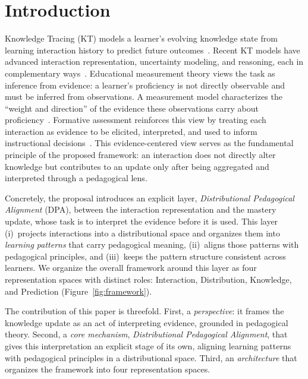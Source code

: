 \documentclass[conference]{IEEEtran}
\begin{document}
\section{Introduction}
\label{sec:intro}

Knowledge Tracing (KT) models a learner's evolving knowledge state from learning interaction history to predict future outcomes~\cite{corbett1994kt, piech2015dkt}. Recent KT models have advanced interaction representation, uncertainty modeling, and reasoning, each in complementary ways~\cite{li2025mckt, xia2025cmdkt, chen2025ukt, li2025keenkt, wu2026sskt, nakagawa2019gkt, zhou2024psikt, hooshyar2026nskt, wu2026plkt}. Educational measurement theory views the task as inference from evidence: a learner's proficiency is not directly observable and must be inferred from observations. A measurement model characterizes the ``weight and direction'' of the evidence these observations carry about proficiency~\cite{mislevy2005ecd}. Formative assessment reinforces this view by treating each interaction as evidence to be elicited, interpreted, and used to inform instructional decisions~\cite{black2009formative}. This evidence-centered view serves as the fundamental principle of the proposed framework: an interaction does not directly alter knowledge but contributes to an update only after being aggregated and interpreted through a pedagogical lens.

Concretely, the proposal introduces an explicit layer, \emph{Distributional Pedagogical Alignment} (DPA), between the interaction representation and the mastery update, whose task is to interpret the evidence before it is used. This layer (i)~projects interactions into a distributional space and organizes them into \emph{learning patterns} that carry pedagogical meaning, (ii)~aligns those patterns with pedagogical principles, and (iii)~keeps the pattern structure consistent across learners. We organize the overall framework around this layer as four representation spaces with distinct roles: Interaction, Distribution, Knowledge, and Prediction (Figure~\ref{fig:framework}).

The contribution of this paper is threefold. First, a \emph{perspective}: it frames the knowledge update as an act of interpreting evidence, grounded in pedagogical theory. Second, a \emph{core mechanism}, \emph{Distributional Pedagogical Alignment}, that gives this interpretation an explicit stage of its own, aligning learning patterns with pedagogical principles in a distributional space. Third, an \emph{architecture} that organizes the framework into four representation spaces.
\end{document}
